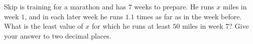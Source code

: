 Skip is training for a marathon and has $7$ weeks to prepare. He runs $x$ miles in week $1$, and in each later week he runs $1.1$ times as far as in the week before. What is the least value of $x$ for which he runs at least $50$ miles in week $7$? Give your answer to two decimal places.
